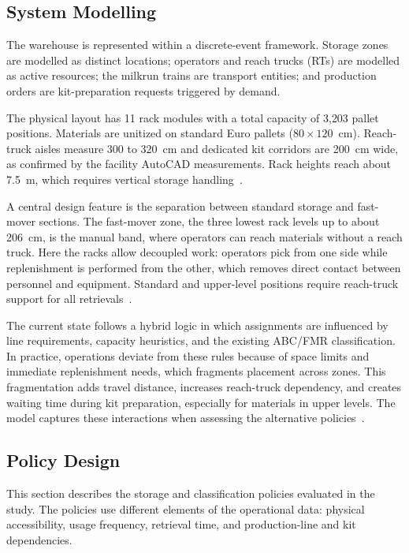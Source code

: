 \documentclass[conference]{IEEEtran}
\begin{document}
\subsection{System Modelling}
The warehouse is represented within a discrete-event framework. Storage zones
are modelled as distinct locations; operators and reach trucks (RTs) are
modelled as active resources; the milkrun trains are transport entities; and
production orders are kit-preparation requests triggered by demand.

The physical layout has 11 rack modules with a total capacity of 3{,}203
pallet positions. Materials are unitized on standard Euro pallets
($80 \times 120$~cm). Reach-truck aisles measure 300 to 320~cm and dedicated
kit corridors are 200~cm wide, as confirmed by the facility AutoCAD
measurements. Rack heights reach about 7.5~m, which requires vertical storage
handling~\cite{bartholdi2014}.

A central design feature is the separation between standard storage and
fast-mover sections. The fast-mover zone, the three lowest rack levels up to
about 206~cm, is the manual band, where operators can reach materials without
a reach truck. Here the racks allow decoupled work: operators pick from one
side while replenishment is performed from the other, which removes direct
contact between personnel and equipment. Standard and upper-level positions
require reach-truck support for all retrievals~\cite{roodbergen2009}.

The current state follows a hybrid logic in which assignments are influenced
by line requirements, capacity heuristics, and the existing ABC/FMR
classification. In practice, operations deviate from these rules because of
space limits and immediate replenishment needs, which fragments placement
across zones. This fragmentation adds travel distance, increases reach-truck
dependency, and creates waiting time during kit preparation, especially for
materials in upper levels. The model captures these interactions when
assessing the alternative policies~\cite{gu2007}.

\subsection{Policy Design}
This section describes the storage and classification policies evaluated in
the study. The policies use different elements of the operational data:
physical accessibility, usage frequency, retrieval time, and production-line
and kit dependencies.
\end{document}

